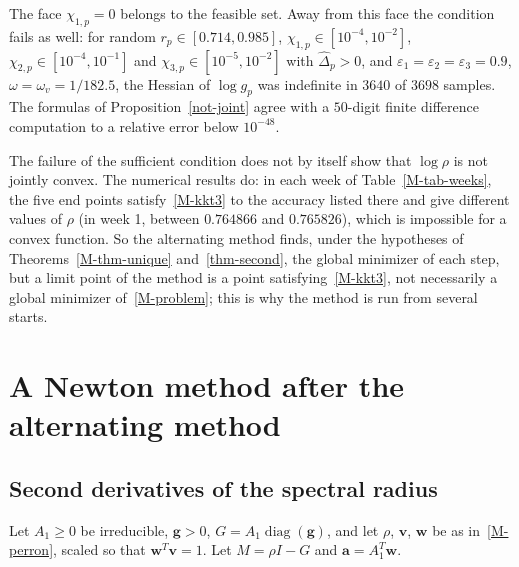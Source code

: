 The face $\chi_{1,p}=0$ belongs to the feasible set. Away from this face the
condition fails as well: for random $r_p\in[0.714,0.985]$,
$\chi_{1,p}\in[10^{-4},10^{-2}]$, $\chi_{2,p}\in[10^{-4},10^{-1}]$ and
$\chi_{3,p}\in[10^{-5},10^{-2}]$ with $\widehat\Delta_p>0$, and
$\varepsilon_1=\varepsilon_2=\varepsilon_3=0.9$, $\omega=\omega_v=1/182.5$, the Hessian of $\log g_p$ was indefinite in $3640$
of $3698$ samples. The formulas of Proposition~\ref{not-joint} agree with a
$50$-digit finite difference computation to a relative error below
$10^{-48}$.

The failure of the sufficient condition does not by itself show that
$\log\rho$ is not jointly convex. The numerical results do: in each week of
Table~\ref{M-tab-weeks}, the five end points satisfy~\eqref{M-kkt3} to the
accuracy listed there and give different values of $\rho$ (in week 1, between
$0.764866$ and $0.765826$), which is impossible for a convex function. So the alternating
method finds, under the hypotheses of Theorems~\ref{M-thm-unique}
and~\ref{thm-second}, the global minimizer of each step, but a limit point of
the method is a point satisfying~\eqref{M-kkt3}, not necessarily a global
minimizer of~\eqref{M-problem}; this is why the method is run from several
starts.

\section{A Newton method after the alternating method}\label{app-newton-method}

\subsection{Second derivatives of the spectral radius}\label{app-hessian}

Let $A_1\ge 0$ be irreducible, $\bm g>0$, $G=A_1\operatorname{diag}(\bm g)$, and
let $\rho$, $\bm v$, $\bm w$ be as in~\eqref{M-perron}, scaled so that
$\bm w^T\bm v=1$. Let $M=\rho I-G$ and $\bm a=A_1^T\bm w$.

